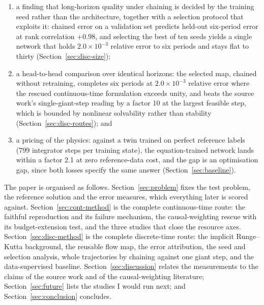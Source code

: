 \documentclass[11pt,a4paper]{article}
\begin{document}
\begin{enumerate}
  number of implicit Runge--Kutta stages against the exactly solved scheme
  shows it scheme-limited at $q=2$ and network-limited from $q=4$ with a
  floor of $3.6\times10^{-3}$ (Section~\ref{sec:disc-results}). A 135-run
  architecture sweep then shows the floor is an optimisation floor rather
  than a capacity one: training loss and held-out error rank-correlate at
  $+0.974$, so networks that fail also fail to train
  (Section~\ref{sec:disc-size});
  \item a finding that long-horizon quality under chaining is decided by
  the training seed rather than the architecture, together with a selection
  protocol that exploits it: chained error on a validation set predicts
  held-out six-period error at rank correlation $+0.98$, and selecting the
  best of ten seeds yields a single network that holds
  $2.0\times10^{-3}$ relative error to six periods and stays flat to
  thirty (Section~\ref{sec:disc-size});
  \item a head-to-head comparison over identical horizons: the selected
  map, chained without retraining, completes six periods at
  $2.0\times10^{-3}$ relative error where the rescued continuous-time
  formulation exceeds unity, and beats the source work's
  single-giant-step reading by a factor 10 at the largest feasible step,
  which is bounded by nonlinear solvability rather than stability
  (Section~\ref{sec:disc-routes}); and
  \item a pricing of the physics: against a twin trained on perfect
  reference labels (799 integrator steps per training state), the
  equation-trained network lands within a factor 2.1 at zero
  reference-data cost, and the gap is an optimisation gap, since both
  losses specify the same answer (Section~\ref{sec:baseline}).
\end{enumerate}

The paper is organised as follows. Section~\ref{sec:problem} fixes the
test problem, the reference solution and the error measures, which
everything later is scored against. Section~\ref{sec:cont-method} is the
complete continuous-time route: the faithful reproduction and its failure
mechanism, the causal-weighting rescue with its budget-extension test, and
the three studies that close the resource axes.
Section~\ref{sec:disc-method} is the complete discrete-time route: the
implicit Runge--Kutta background, the reusable flow map, the error
attribution, the seed and selection analysis, whole trajectories by
chaining against one giant step, and the data-supervised baseline.
Section~\ref{sec:discussion} relates the measurements to the claims of the
source work and of the causal-weighting literature;
Section~\ref{sec:future} lists the studies I would run next; and
Section~\ref{sec:conclusion} concludes.
\end{document}
